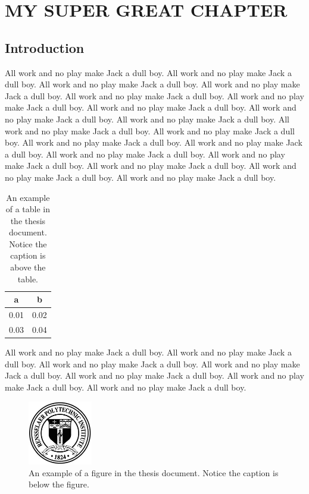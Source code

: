 \chapter{MY SUPER GREAT CHAPTER}
\label{chap:intro}

\let\thefootnote\relax{}

\section{Introduction}

All work and no play make Jack a dull boy.
All work and no play make Jack a dull boy.
All work and no play make Jack a dull boy.
All work and no play make Jack a dull boy.
All work and no play make Jack a dull boy.
All work and no play make Jack a dull boy.
All work and no play make Jack a dull boy.
All work and no play make Jack a dull boy.
All work and no play make Jack a dull boy.
All work and no play make Jack a dull boy.
All work and no play make Jack a dull boy.
All work and no play make Jack a dull boy.
All work and no play make Jack a dull boy.
All work and no play make Jack a dull boy.
All work and no play make Jack a dull boy.
All work and no play make Jack a dull boy.
All work and no play make Jack a dull boy.
All work and no play make Jack a dull boy.

\begin{table}[hbt!]
\centering
\begin{tabular}{|c | c |}
\hline
a & b \\ \hline\hline
0.01 & 0.02 \\ \hline
0.03 & 0.04 \\ \hline
\end{tabular}
\caption{An example of a table in the thesis document.
Notice the caption is above the table.}
\label{table:mytable}
\end{table}

All work and no play make Jack a dull boy.
All work and no play make Jack a dull boy.
All work and no play make Jack a dull boy.
All work and no play make Jack a dull boy.
All work and no play make Jack a dull boy.
All work and no play make Jack a dull boy.
All work and no play make Jack a dull boy.

\begin{figure}[ht!]
\centering
\includegraphics[width=0.25\textwidth]{rpi_seal}
\caption{An example of a figure in the thesis document.
Notice the caption is below the figure.}
\label{fig:myfigure}
\end{figure}

